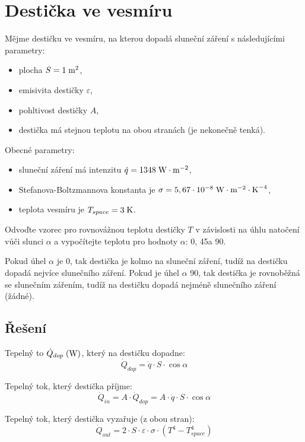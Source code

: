 \documentclass{article}
\begin{document}
\newpage




\section{ Destička ve vesmíru \spicy \spicy}
Mějme destičku ve vesmíru, na kterou dopadá sluneční záření s následujícími parametry:
\begin{itemize}
    \item plocha $S = 1 \; \textrm{m}^{\textrm{2}}$,
    \item emisivita destičky $\varepsilon$,
    \item pohltivost destičky $A$,
    \item destička má stejnou teplotu na obou stranách (je nekonečně tenká).
\end{itemize}

Obecné parametry:
\begin{itemize}
    \item sluneční záření má intenzitu $\dot{q} = 1348 \; \textrm{W} \cdot \textrm{m}^{-2}$,
    \item Stefanova-Boltzmannova konstanta je $\sigma = 5,67 \cdot 10^{-8} \; \textrm{W} \cdot \textrm{m}^{-2} \cdot \textrm{K}^{-4}$,
    \item teplota vesmíru je $T_{space} = 3 \; \textrm{K}$.
\end{itemize}

Odvoďte vzorec pro rovnovážnou teplotu destičky $T$ v závislosti na úhlu natočení vůči slunci $\alpha$ a vypočítejte teplotu pro hodnoty $\alpha$: 0\ueqDEGREE, 45\ueqDEGREE a 90\ueqDEGREE.

Pokud úhel $\alpha$ je 0\ueqDEGREE, tak destička je kolmo na sluneční záření, tudíž na destičku dopadá nejvíce slunečního záření. Pokud je úhel $\alpha$ 90\ueqDEGREE, tak destička je rovnoběžná se slunečním zářením, tudíž na destičku dopadá nejméně slunečního záření (žádné).



\subsection{Řešení}
Tepelný to $\dot{Q}_{dop} \; (\textrm{W})$, který na destičku dopadne:
$$
    \dot{Q}_{dop} = \dot{q} \cdot S \cdot \cos \alpha
$$

Tepelný tok, který destička příjme:
$$
    \dot{Q}_{in} = A \cdot \dot{Q}_{dop} = A \cdot \dot{q} \cdot S \cdot \cos \alpha
$$

Tepelný tok, který destička vyzařuje (z obou stran):
$$
    \dot{Q}_{out} = 2 \cdot S \cdot \varepsilon \cdot \sigma \cdot \left( T^4 - T_{space}^4 \right)
$$
\end{document}
